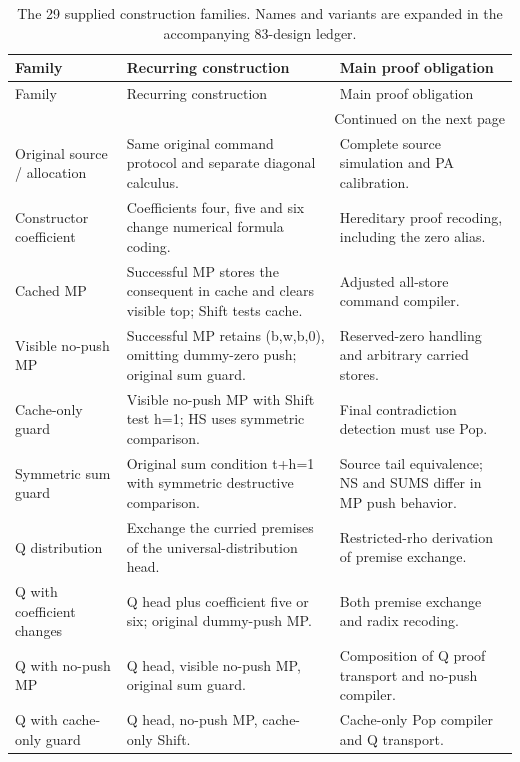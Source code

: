 \begingroup
\small
\setlength{\tabcolsep}{3pt}
\begin{longtable}{p{}p{}p{}}
\caption{The 29 supplied construction families. Names and variants are expanded in the accompanying 83-design ledger.}\label{tab:comparison-families}\\
\toprule Family & Recurring construction & Main proof obligation \\ \midrule
\endfirsthead
\toprule Family & Recurring construction & Main proof obligation \\ \midrule
\endhead
\midrule\multicolumn{3}{r}{Continued on the next page}\\
\endfoot
\bottomrule
\endlastfoot
Original source / allocation & Same original command protocol and separate diagonal calculus. & Complete source simulation and PA calibration. \\
Constructor coefficient & Coefficients four, five and six change numerical formula coding. & Hereditary proof recoding, including the zero alias. \\
Cached MP & Successful MP stores the consequent in cache and clears visible top; Shift tests cache. & Adjusted all-store command compiler. \\
Visible no-push MP & Successful MP retains (b,w,b,0), omitting dummy-zero push; original sum guard. & Reserved-zero handling and arbitrary carried stores. \\
Cache-only guard & Visible no-push MP with Shift test h=1; HS uses symmetric comparison. & Final contradiction detection must use Pop. \\
Symmetric sum guard & Original sum condition t+h=1 with symmetric destructive comparison. & Source tail equivalence; NS and SUMS differ in MP push behavior. \\
Q distribution & Exchange the curried premises of the universal-distribution head. & Restricted-rho derivation of premise exchange. \\
Q with coefficient changes & Q head plus coefficient five or six; original dummy-push MP. & Both premise exchange and radix recoding. \\
Q with no-push MP & Q head, visible no-push MP, original sum guard. & Composition of Q proof transport and no-push compiler. \\
Q with cache-only guard & Q head, no-push MP, cache-only Shift. & Cache-only Pop compiler and Q transport. \\

\end{longtable}
